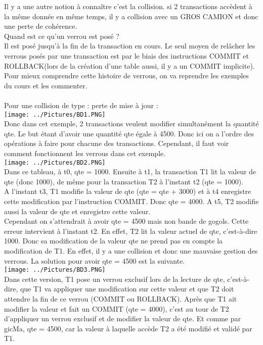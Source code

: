 \documentclass{report}
\begin{document}
Il y a une autre notion à connaître c'est la collision. si 2 transactions accèdent à la même donnée en même temps, il y a collision avec un GROS CAMION et donc une perte de cohérence.\\
Quand est ce qu'un verrou est posé ?\\
Il est posé jusqu'à la fin de la transaction en cours. Le seul moyen de relâcher les verrous posés par une transaction est par le biais des instructions COMMIT et ROLLBACK(lors de la création d'une table aussi, il y a un COMMIT implicite).\\
Pour mieux comprendre cette histoire de verrous, on va reprendre les exemples du cours et les commenter.\\\\
Pour une collision de type : perte de mise à jour :\\
\texttt{[image: ../Pictures/BD1.PNG]}\\
Donc dans cet exemple, 2 transactions veulent modifier simultanément la quantité qte. Le but étant d'avoir une quantité qte égale à 4500. Donc ici on a l'ordre des opérations à faire pour chacune des transactions. Cependant, il faut voir comment fonctionnent les verrous dans cet exemple.\\
\texttt{[image: ../Pictures/BD2.PNG]}\\
Dans ce tableau, à t0, qte = 1000. Ensuite à t1, la transaction T1 lit la valeur de qte (donc 1000), de même pour la transaction T2 à l'instant t2 (qte = 1000).\\
A l'instant t3, T1 modifie la valeur de qte (qte = qte + 3000) et à t4 enregistre cette modification par l'instruction COMMIT. Donc qte = 4000. A t5, T2 modifie aussi la valeur de qte et enregistre cette valeur.\\
Cependant on s'attendrait à avoir qte = 4500 mais non bande de gogols. Cette erreur intervient à l'instant t2. En effet, T2 lit la valeur actuel de qte, c'est-à-dire 1000. Donc sa modification de la valeur qte ne prend pas en compte la modification de T1. En effet, il y a une collision et donc une mauvaise gestion des verrous. La solution pour avoir qte = 4500 est la suivante.\\
\texttt{[image: ../Pictures/BD3.PNG]}\\ 
Dans cette version, T1 pose un verrou exclusif lors de la lecture de qte, c'est-à-dire, que T1 va appliquer une modification sur cette valeur et que T2 doit attendre la fin de ce verrou (COMMIT ou ROLLBACK). Après que T1 ait modifier la valeur et fait un COMMIT (qte = 4000), c'est au tour de T2 d'appliquer un verrou exclusif et de modifier la valeur de qte. Et comme par gicMa, qte = 4500, car la valeur à laquelle accède T2 a été modifié et validé par T1.\\\\
\end{document}
